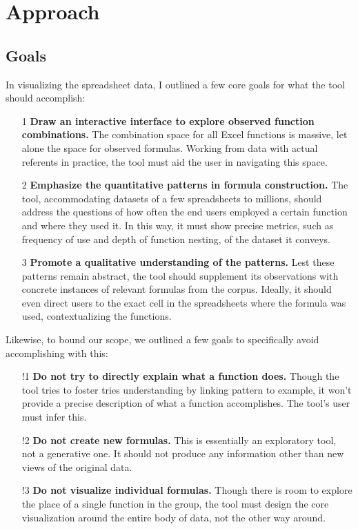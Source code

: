 \documentclass[conference]{IEEEtran}
\begin{document}
\section{Approach}
\subsection{Goals}
In visualizing the spreadsheet data, I outlined a few core goals for what the tool should accomplish:
\begin{itemize}
	\item [1] \textbf{Draw an interactive interface to explore observed function combinations.} The combination space for all Excel functions is massive, let alone the space for observed formulas. Working from data with actual referents in practice, the tool must aid the user in navigating this space.
	\item [2] \textbf{Emphasize the quantitative patterns in formula construction.} The tool, accommodating datasets of a few spreadsheets to millions, should address the questions of how often the end users employed a certain function and where they used it. In this way, it must show precise metrics, such as frequency of  use and depth of function nesting, of the dataset it conveys.
	\item [3] \textbf{Promote a qualitative understanding of the patterns.} Lest these patterns remain abstract, the tool should supplement its observations with concrete instances of relevant formulas from the corpus. Ideally, it should even direct users to the exact cell in the spreadsheets where the formula was used, contextualizing the functions. 
\end{itemize} \par
Likewise, to bound our scope, we outlined a few goals to specifically avoid accomplishing with this:
\begin{itemize}
	\item [!1] \textbf{Do not try to directly explain what a function does.} Though the tool tries to foster tries understanding by linking pattern to example, it won't provide a precise description of what a function accomplishes. The tool's user must infer this.
	\item [!2] \textbf{Do not create new formulas.} This is essentially an exploratory tool, not a generative one. It should not produce any information other than new views of the original data. 
	\item [!3] \textbf{Do not visualize individual formulas.} Though there is room to explore the place of a single function in the group, the tool must design the core visualization around the entire body of data, not the other way around.
\end{itemize}
\end{document}
